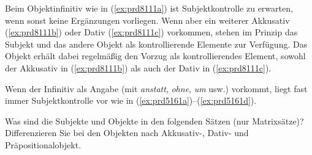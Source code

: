 Beim Objektinfinitiv wie in (\ref{ex:prd8111a}) ist Subjektkontrolle zu erwarten, wenn sonst keine Ergänzungen vorliegen.
Wenn aber ein weiterer Akkusativ (\ref{ex:prd8111b}) oder Dativ (\ref{ex:prd8111c}) vorkommen, stehen im Prinzip das Subjekt und das andere Objekt als kontrollierende Elemente zur Verfügung.
Das Objekt erhält dabei regelmäßig den Vorzug als kontrollierendes Element, sowohl der Akkusativ in (\ref{ex:prd8111b}) als auch der Dativ in (\ref{ex:prd8111c}).

\begin{exe}
  \ex\label{ex:prd8111} 
  \begin{xlist}
  \end{xlist}
\end{exe}

Wenn der Infinitiv als Angabe (mit \textit{anstatt}, \textit{ohne}, \textit{um} usw.) vorkommt, liegt fast immer Subjektkontrolle vor wie in (\ref{ex:prd5161a})--(\ref{ex:prd5161d}).

\begin{exe}
  \ex\label{ex:prd5161} 
  \begin{xlist}
  \end{xlist}
\end{exe}


\Uebungen

\Uebung \label{u131} Was sind die Subjekte und Objekte in den folgenden Sätzen (nur Matrixsätze)?
Differenzieren Sie bei den Objekten nach Akkusativ-, Dativ- und Präpositionalobjekt.

